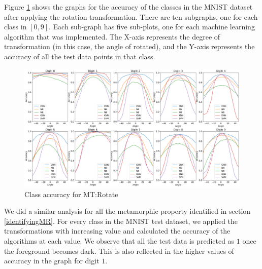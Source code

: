     Figure \ref{fig:Digit by misclassification for Rotation MR} shows the graphs for the accuracy of the classes in the MNIST dataset after applying the rotation transformation. There are ten subgraphs, one for each class in $[0,9]$. Each sub-graph has five sub-plots, one for each machine learning algorithm that was implemented. The X-axis represents the degree of transformation (in this case, the angle of rotated), and the Y-axis represents the accuracy of all the test data points in that class.\\
    \begin{figure}[H]
    \centering
        \includegraphics[width=\textwidth]{chapters/results/MT/RotateAll.png}
        \caption{Class accuracy for MT:Rotate}
        \label{fig:Digit by misclassification for Rotation MR}
    \end{figure}
    
     We did a similar analysis for all the metamorphic property identified in section \ref{identifyingMR}. For every class in the MNIST test dataset, we applied the transformations with increasing value and calculated the accuracy of the algorithms at each value. We observe that all the test data is predicted as $1$ once the foreground becomes dark. This is also reflected in the higher values of accuracy in the graph for digit $1$.
        
